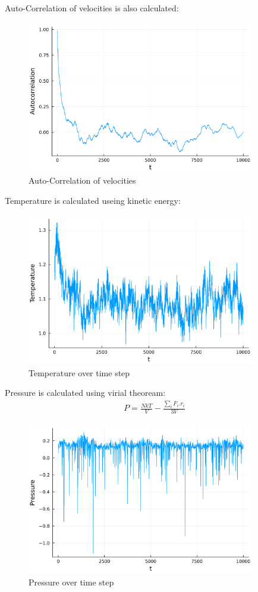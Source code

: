 \documentclass[12pt,a4paper]{article}
\begin{document}
		Auto-Correlation of velocities is also calculated:
		\begin{figure}[H]
			\centering
			\includegraphics[width=10cm]{auto.png}
			\caption{Auto-Correlation of velocities}
		\end{figure}
		Temperature is calculated useing kinetic energy:
		\begin{figure}[H]
			\centering
			\includegraphics[width=10cm]{T.png}
			\caption{Temperature over time step}
		\end{figure}
		Pressure is calculated using virial theoream:
		\begin{align*}
			P = \frac{NkT}{V} - \frac{\sum_{i}^{} F_i.r_i}{3V}
		\end{align*}
		\begin{figure}[H]
			\centering
			\includegraphics[width=10cm]{P.png}
			\caption{Pressure over time step}
		\end{figure}
\end{document}
